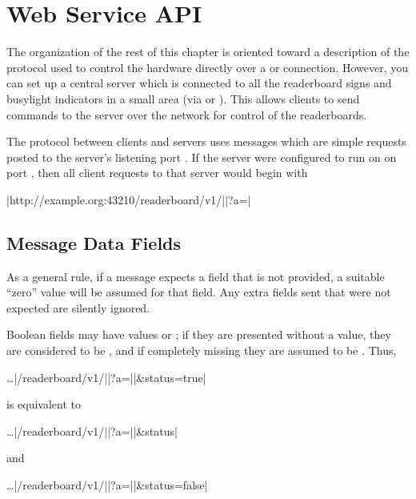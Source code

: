 \section{Web Service API}
The organization of the rest of this chapter is oriented toward a description of the
protocol used to control the hardware directly over a  or 
connection. However, you can set up a central server which is connected to all the
readerboard signs and busylight indicators in a small area (via  or ).
This allows clients to send commands to the server over the network for control of the readerboards.

The protocol between clients and servers uses messages which are simple  requests
posted to the server's listening port . If the server were configured to run
on  on port , then all client requests to that server would begin with

\begin{Coding}
	|http://example.org:43210/readerboard/v1/||?a=|
\end{Coding}

\subsection{Message Data Fields}
As a general rule, if a message expects a field that is not provided, a suitable ``zero'' value will be assumed
for that field. Any extra fields sent that were not expected are silently ignored.

Boolean fields may have values  or ; if they are presented without a value, they are considered to be
, and if completely missing they are assumed to be . Thus,

\begin{Coding}
	\dots|/readerboard/v1/||?a=||&status=true|
\end{Coding}

\noindent is equivalent to

\begin{Coding}
	\dots|/readerboard/v1/||?a=||&status|
\end{Coding}

\noindent and

\begin{Coding}
	\dots|/readerboard/v1/||?a=||&status=false|
\end{Coding}

